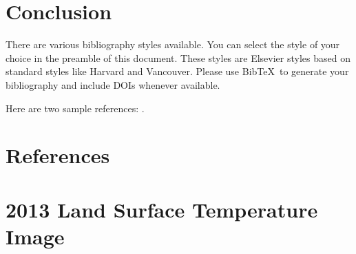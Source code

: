 \documentclass[]{elsarticle}
\begin{document}
\section{Conclusion}

There are various bibliography styles available. You can select the style of your choice in the preamble of this document. These styles are Elsevier styles based on standard styles like Harvard and Vancouver. Please use Bib\TeX\ to generate your bibliography and include DOIs whenever available.

Here are two sample references: \cite{Feynman1963118,Dirac1953888}.

\section*{References}



\appendix
\section{2013 Land Surface Temperature Image}
\end{document}

